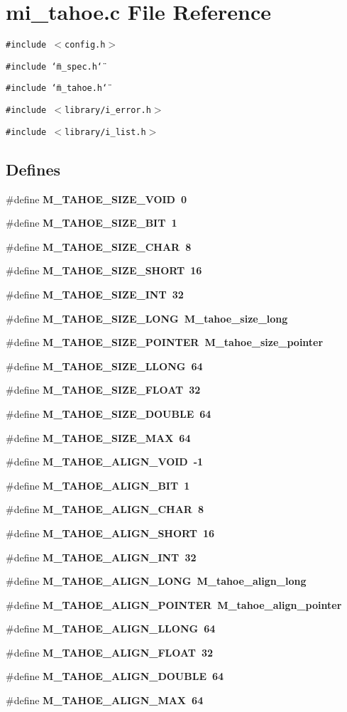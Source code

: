 \section{mi\_\-tahoe.c File Reference}
\label{mi__tahoe_8c}
{\tt \#include $<$config.h$>$}\par
{\tt \#include \char`\"{}m\_\-spec.h\char`\"{}}\par
{\tt \#include \char`\"{}m\_\-tahoe.h\char`\"{}}\par
{\tt \#include $<$library/i\_\-error.h$>$}\par
{\tt \#include $<$library/i\_\-list.h$>$}\par
\subsection*{Defines}
\begin{CompactItemize}
\item 
\#define \bf{M\_\-TAHOE\_\-SIZE\_\-VOID}~0
\item 
\#define \bf{M\_\-TAHOE\_\-SIZE\_\-BIT}~1
\item 
\#define \bf{M\_\-TAHOE\_\-SIZE\_\-CHAR}~8
\item 
\#define \bf{M\_\-TAHOE\_\-SIZE\_\-SHORT}~16
\item 
\#define \bf{M\_\-TAHOE\_\-SIZE\_\-INT}~32
\item 
\#define \bf{M\_\-TAHOE\_\-SIZE\_\-LONG}~\bf{M\_\-tahoe\_\-size\_\-long}
\item 
\#define \bf{M\_\-TAHOE\_\-SIZE\_\-POINTER}~\bf{M\_\-tahoe\_\-size\_\-pointer}
\item 
\#define \bf{M\_\-TAHOE\_\-SIZE\_\-LLONG}~64
\item 
\#define \bf{M\_\-TAHOE\_\-SIZE\_\-FLOAT}~32
\item 
\#define \bf{M\_\-TAHOE\_\-SIZE\_\-DOUBLE}~64
\item 
\#define \bf{M\_\-TAHOE\_\-SIZE\_\-MAX}~64
\item 
\#define \bf{M\_\-TAHOE\_\-ALIGN\_\-VOID}~-1
\item 
\#define \bf{M\_\-TAHOE\_\-ALIGN\_\-BIT}~1
\item 
\#define \bf{M\_\-TAHOE\_\-ALIGN\_\-CHAR}~8
\item 
\#define \bf{M\_\-TAHOE\_\-ALIGN\_\-SHORT}~16
\item 
\#define \bf{M\_\-TAHOE\_\-ALIGN\_\-INT}~32
\item 
\#define \bf{M\_\-TAHOE\_\-ALIGN\_\-LONG}~\bf{M\_\-tahoe\_\-align\_\-long}
\item 
\#define \bf{M\_\-TAHOE\_\-ALIGN\_\-POINTER}~\bf{M\_\-tahoe\_\-align\_\-pointer}
\item 
\#define \bf{M\_\-TAHOE\_\-ALIGN\_\-LLONG}~64
\item 
\#define \bf{M\_\-TAHOE\_\-ALIGN\_\-FLOAT}~32
\item 
\#define \bf{M\_\-TAHOE\_\-ALIGN\_\-DOUBLE}~64
\item 
\#define \bf{M\_\-TAHOE\_\-ALIGN\_\-MAX}~64
\end{CompactItemize}
